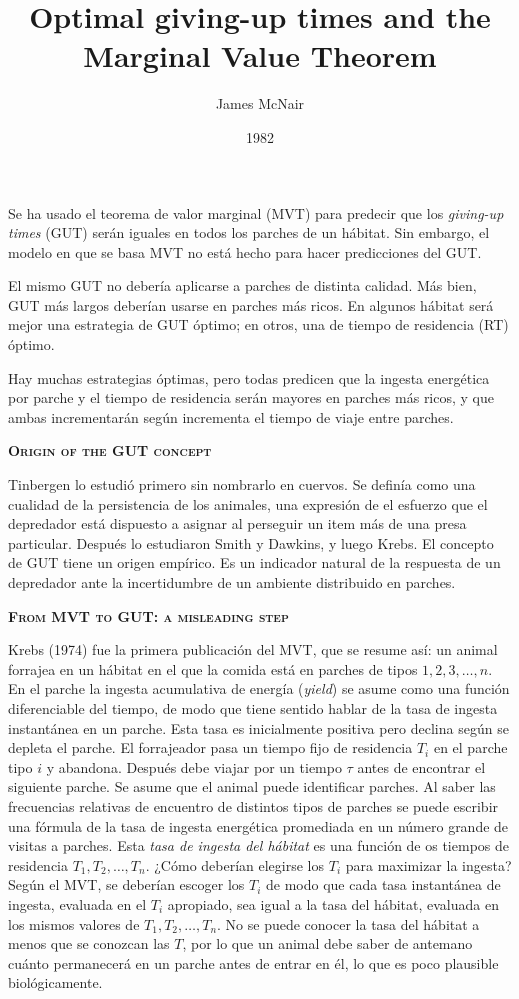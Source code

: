 \documentclass[a4paper,12pt]{article}
\title{Optimal giving-up times and the Marginal Value Theorem}
\author{James McNair}
\date{1982}
\begin{document}
{\scshape\bfseries \maketitle}

Se ha usado el teorema de valor marginal (MVT) para predecir que los {\itshape giving-up times} (GUT) serán iguales en todos los parches de un hábitat. Sin embargo, el modelo en que se basa MVT no está hecho para hacer predicciones del GUT.

El mismo GUT no debería aplicarse a parches de distinta calidad. Más bien, GUT más largos deberían usarse en parches más ricos. En algunos hábitat será mejor una estrategia de GUT óptimo; en otros, una de tiempo de residencia (RT) óptimo.

Hay muchas estrategias óptimas, pero todas predicen que la ingesta energética por parche y el tiempo de residencia serán mayores en parches más ricos, y que ambas incrementarán según incrementa el tiempo de viaje entre parches.

{\scshape\bfseries Origin of the GUT concept}

Tinbergen lo estudió primero sin nombrarlo en cuervos. Se definía como una cualidad de la persistencia de los animales, una expresión de el esfuerzo que el depredador está dispuesto a asignar al perseguir un item más de una presa particular.
Después lo estudiaron Smith y Dawkins, y luego Krebs. El concepto de GUT tiene un origen empírico. Es un indicador natural de la respuesta de un depredador ante la incertidumbre de un ambiente distribuido en parches.

{\scshape\bfseries From MVT to GUT: a misleading step}

Krebs (1974) fue la primera publicación del MVT, que se resume así: un animal forrajea en un hábitat en el que la comida está en parches de tipos $1, 2, 3,\ldots, n$. En el parche la ingesta acumulativa de energía ({\itshape yield}) se asume como una función diferenciable del tiempo, de modo que tiene sentido hablar de la tasa de ingesta instantánea en un parche. Esta tasa es inicialmente positiva pero declina según se depleta el parche. El forrajeador pasa un tiempo fijo de residencia $T_{i}$ en el parche tipo $i$ y abandona. Después debe viajar por un tiempo $\tau$ antes de encontrar el siguiente parche. Se asume que el animal puede identificar parches. Al saber las frecuencias relativas de encuentro de distintos tipos de parches se puede escribir una fórmula de la tasa de ingesta energética promediada en un número grande de visitas a parches. Esta {\itshape tasa de ingesta del hábitat} es una función de os tiempos de residencia $T_{1}, T_{2},\ldots, T_{n}$. ¿Cómo deberían elegirse los $T_{i}$ para maximizar la ingesta? Según el MVT, se deberían escoger los $T_{i}$ de modo que cada tasa instantánea de ingesta, evaluada en el $T_{i}$ apropiado, sea igual a la tasa del hábitat, evaluada en los mismos valores de $T_{1}, T_{2},\ldots,T_{n}$. No se puede conocer la tasa del hábitat a menos que se conozcan las $T$, por lo que un animal debe saber de antemano cuánto permanecerá en un parche antes de entrar en él, lo que es poco plausible biológicamente.
\end{document}
